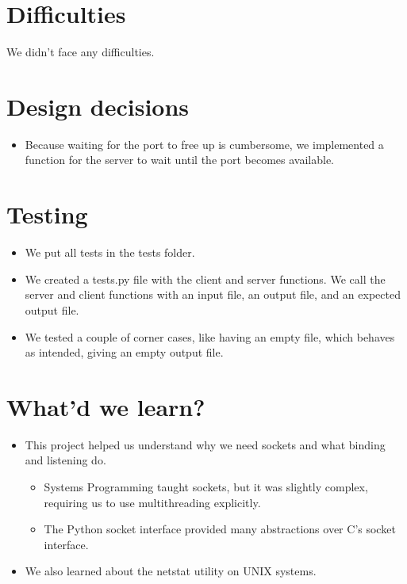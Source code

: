 \documentclass{article}
\begin{document}
\section{Difficulties}

We didn't face any difficulties.

\section{Design decisions}

\begin{itemize}
    \item Because waiting for the port to free up is cumbersome, we implemented a function for the server to wait until the port becomes available.
\end{itemize}

\section{Testing}
\begin{itemize}
    \item We put all tests in the tests folder.
    \item We created a tests.py file with the client and server functions. We call the server and client functions with an input file, an output file, and an expected output file.
    \item We tested a couple of corner cases, like having an empty file, which behaves as intended, giving an empty output file.
\end{itemize}

\section{What'd we learn?}

\begin{itemize}
    \item This project helped us understand why we need sockets and what binding and listening do.
    \begin{itemize}
        \item Systems Programming taught sockets, but it was slightly complex, requiring us to use multithreading explicitly.
        \item The Python socket interface provided many abstractions over C's socket interface.
    \end{itemize}
    \item We also learned about the netstat utility on UNIX systems.
\end{itemize}
\end{document}
